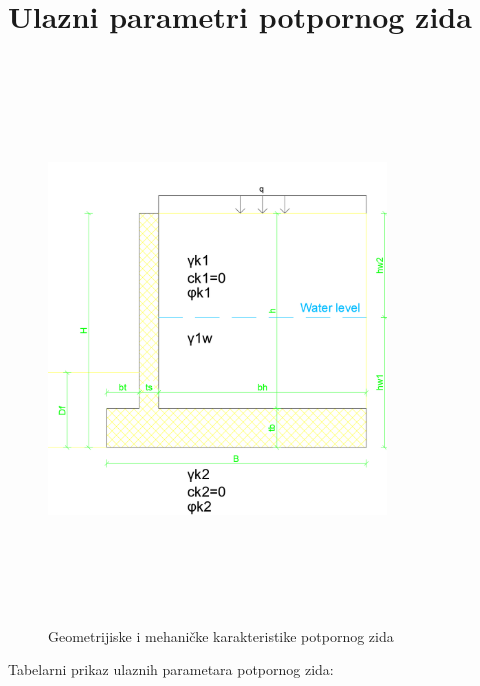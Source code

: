 \documentclass[a4paper, 11pt]{article}
\begin{document}
\section*{Ulazni parametri potpornog zida} 

\vspace{3cm}

\begin{figure}[h]
    \centering
    \includegraphics[width=0.8\textwidth, height=15cm]{../Graphics/RetainingWall1_geometry.png}
    \caption{Geometrijiske i mehani\v{c}ke karakteristike potpornog zida}
    \label{geometrija_zida}
\end{figure}

\newpage

\begin{center}
Tabelarni prikaz ulaznih parametara potpornog zida:
\end{center}
\end{document}
